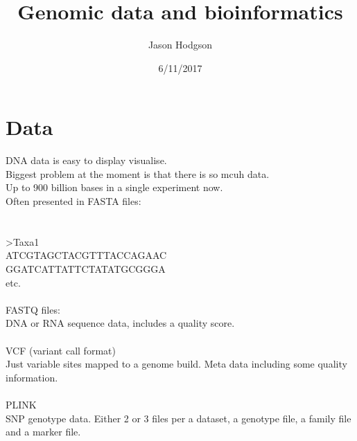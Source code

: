 \documentclass[11pt]{article}
\title{Genomic data and bioinformatics}
\author{Jason Hodgson}
\date{6/11/2017}
\begin{document}
\maketitle
\section{Data}
DNA data is easy to display visualise.\\
Biggest problem at the moment is that there is so mcuh data. \\
Up to 900 billion bases in a single experiment now.\\
Often presented in FASTA files: \\
\\
\\
>Taxa1\\
ATCGTAGCTACGTTTACCAGAAC\\
GGATCATTATTCTATATGCGGGA\\
etc.
\\
\\
FASTQ files: \\
DNA or RNA sequence data, includes a quality score.
\\
\\
VCF (variant call format)\\
Just variable sites mapped to a genome build. Meta data including some quality information.\\
\\
PLINK\\
SNP genotype data. Either 2 or 3 files per a dataset, a genotype file, a family file and a marker file.\\
\end{document}
